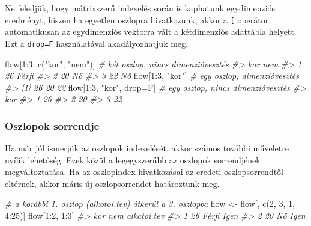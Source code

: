 \documentclass[
]{book}
\newenvironment{Shaded}{\begin{snugshade}}{\end{snugshade}}
\newcommand{\CommentTok}[1]{\textcolor[rgb]{0.56,0.35,0.01}{\textit{#1}}}
\newcommand{\DecValTok}[1]{\textcolor[rgb]{0.00,0.00,0.81}{#1}}
\newcommand{\FunctionTok}[1]{\textcolor[rgb]{0.00,0.00,0.00}{#1}}
\newcommand{\NormalTok}[1]{#1}
\newcommand{\OtherTok}[1]{\textcolor[rgb]{0.56,0.35,0.01}{#1}}
\newcommand{\SpecialCharTok}[1]{\textcolor[rgb]{0.00,0.00,0.00}{#1}}
\newcommand{\StringTok}[1]{\textcolor[rgb]{0.31,0.60,0.02}{#1}}
\begin{document}
Ne feledjük, hogy mátrixszerű indexelés során is kaphatunk egydimenziós eredményt, hiszen ha egyetlen oszlopra hivatkozunk, akkor a \texttt{{[}} operátor automatikusan az egydimenziós vektorra vált a kétdimenziós adattábla helyett. Ezt a \texttt{drop=F} használatával akadályozhatjuk meg.

\begin{Shaded}
\begin{Highlighting}[]
\NormalTok{flow[}\DecValTok{1}\SpecialCharTok{:}\DecValTok{3}\NormalTok{, }\FunctionTok{c}\NormalTok{(}\StringTok{"kor"}\NormalTok{, }\StringTok{"nem"}\NormalTok{)] }\CommentTok{\# két oszlop, nincs dimenzióvesztés}
\CommentTok{\#\textgreater{}   kor   nem}
\CommentTok{\#\textgreater{} 1  26 Férfi}
\CommentTok{\#\textgreater{} 2  20    Nő}
\CommentTok{\#\textgreater{} 3  22    Nő}
\NormalTok{flow[}\DecValTok{1}\SpecialCharTok{:}\DecValTok{3}\NormalTok{, }\StringTok{"kor"}\NormalTok{]           }\CommentTok{\# egy oszlop, dimenzióvesztés}
\CommentTok{\#\textgreater{} [1] 26 20 22}
\NormalTok{flow[}\DecValTok{1}\SpecialCharTok{:}\DecValTok{3}\NormalTok{, }\StringTok{"kor"}\NormalTok{, drop}\OtherTok{=}\NormalTok{F]   }\CommentTok{\# egy oszlop, nincs dimenzióvesztés}
\CommentTok{\#\textgreater{}   kor}
\CommentTok{\#\textgreater{} 1  26}
\CommentTok{\#\textgreater{} 2  20}
\CommentTok{\#\textgreater{} 3  22}
\end{Highlighting}
\end{Shaded}

\hypertarget{oszlopok-sorrendje}{%
\subsubsection{Oszlopok sorrendje}\label{oszlopok-sorrendje}}

Ha már jól ismerjük az oszlopok indexelését, akkor számos további műveletre nyílik lehetőség. Ezek közül a legegyszerűbb az oszlopok sorrendjének megváltoztatása. Ha az oszlopindex hivatkozásai az eredeti oszlopsorrendtől eltérnek, akkor máris új oszlopsorrendet határoztunk meg.

\begin{Shaded}
\begin{Highlighting}[]
\CommentTok{\# a korábbi 1. oszlop (alkotoi.tev) átkerül a 3. oszlopba}
\NormalTok{flow }\OtherTok{\textless{}{-}}\NormalTok{ flow[, }\FunctionTok{c}\NormalTok{(}\DecValTok{2}\NormalTok{, }\DecValTok{3}\NormalTok{, }\DecValTok{1}\NormalTok{, }\DecValTok{4}\SpecialCharTok{:}\DecValTok{25}\NormalTok{)] }
\NormalTok{flow[}\DecValTok{1}\SpecialCharTok{:}\DecValTok{2}\NormalTok{, }\DecValTok{1}\SpecialCharTok{:}\DecValTok{3}\NormalTok{]}
\CommentTok{\#\textgreater{}   kor   nem alkatoi.tev}
\CommentTok{\#\textgreater{} 1  26 Férfi        Igen}
\CommentTok{\#\textgreater{} 2  20    Nő        Igen}
\end{Highlighting}
\end{Shaded}
\end{document}
